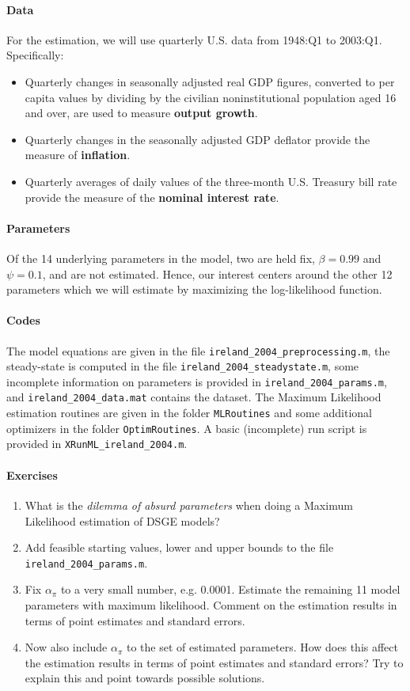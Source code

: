 \documentclass{article}
\begin{document}
\paragraph{Data}
For the estimation, we will use quarterly U.S. data from 1948:Q1 to 2003:Q1. Specifically:
\begin{itemize}
	\item Quarterly changes in seasonally adjusted real GDP figures, converted to per capita values by dividing by the civilian noninstitutional population aged 16 and over, are used to measure \textbf{output growth}.
	\item Quarterly changes in the seasonally adjusted GDP deflator provide the measure of \textbf{inflation}.
	\item Quarterly averages of daily values of the three-month U.S. Treasury bill rate provide the measure of the \textbf{nominal interest rate}.
\end{itemize}

\paragraph{Parameters}
Of the 14 underlying parameters in the model, two are held fix, $\beta=0.99$ and $\psi=0.1$, and are not estimated.
Hence, our interest centers around the other 12 parameters which we will estimate by maximizing the log-likelihood function.

\paragraph{Codes}
The model equations are given in the file \texttt{ireland\_2004\_preprocessing.m}, the steady-state is computed in the file \texttt{ireland\_2004\_steadystate.m},
  some incomplete information on parameters is provided in \texttt{ireland\_2004\_params.m}, and \texttt{ireland\_2004\_data.mat} contains the dataset.
The Maximum Likelihood estimation routines are given in the folder \texttt{MLRoutines} and some additional optimizers in the folder \texttt{OptimRoutines}.
A basic (incomplete) run script is provided in \texttt{XRunML\_ireland\_2004.m}.


\paragraph{Exercises}
\begin{enumerate}
	\item What is the \emph{dilemma of absurd parameters} when doing a Maximum Likelihood estimation of DSGE models?
	\item Add feasible starting values, lower and upper bounds to the file \texttt{ireland\_2004\_params.m}.
	\item Fix $\alpha_\pi$ to a very small number, e.g. 0.0001.
	Estimate the remaining 11 model parameters with maximum likelihood.
	Comment on the estimation results in terms of point estimates and standard errors.
	\item Now also include $\alpha_\pi$ to the set of estimated parameters.
	How does this affect the estimation results in terms of point estimates and standard errors?
	Try to explain this and point towards possible solutions.
\end{enumerate}
\end{document}
